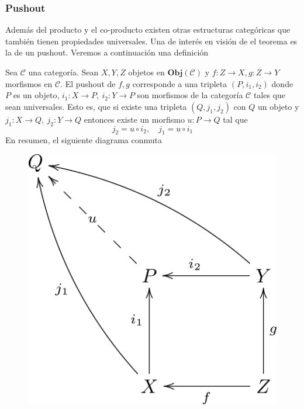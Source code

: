 \subsubsection{Pushout}
Además del producto y el co-producto existen otras estructuras
categóricas que también tienen propiedades universales. Una de interés
en visión de el teorema \vank es la de un pushout. Veremos a
continuación una definición
\begin{definicion}[Pushout]
Sea \(\mathscr{C}\) una categoría. Sean \(X,Y,Z\) objetos en
\(\mathbf{Obj}(\mathscr{C})\) y \(f : Z \to X , g : Z \to Y\) morfismos
en \(\mathscr{C}\). El pushout de \(f,g\) corresponde a una tripleta
\((P, i_1, i_2)\) donde \(P\) es un objeto, \(i_1 : X \to P ,\ i_2 : Y
\to P\) son morfismos de la categoría \(\mathscr{C}\) tales que sean
universales. Esto es, que si existe una tripleta \((Q, j_1, j_2)\) con
\(Q\) un objeto y \(j_1 : X \to Q,\ j_2 : Y \to Q\) entonces existe un
morfismo \(u : P \to Q\) tal que
\[ j_2 = u \circ i_2,\quad j_1 = u \circ i_1 \]
En resumen, el siguiente diagrama conmuta
\begin{figure}[h]
    \centering \includegraphics[scale=1]{./imagenes/pushout.png}
\end{figure}
\end{definicion}

